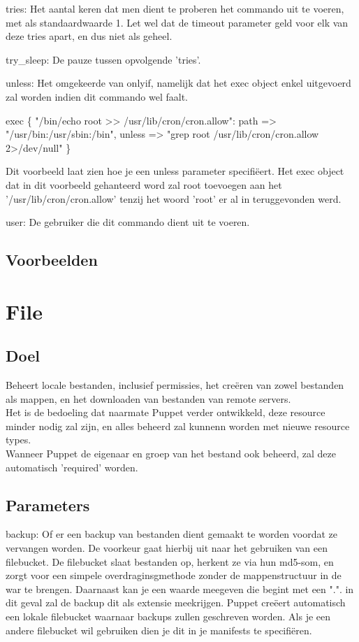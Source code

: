 		tries:
		Het aantal keren dat men dient te proberen het commando uit te voeren, met als standaardwaarde 1.
		Let wel dat de timeout parameter geld voor elk van deze tries apart, en dus niet als geheel.

		try\_sleep:
		De pauze tussen opvolgende 'tries'.

		unless:
		Het omgekeerde van onlyif, namelijk dat het exec object enkel uitgevoerd zal worden indien dit commando wel faalt.

			exec \{ "/bin/echo root >> /usr/lib/cron/cron.allow":
				path => "/usr/bin:/usr/sbin:/bin",
				unless => "grep root /usr/lib/cron/cron.allow 2>/dev/null"
			\}

		Dit voorbeeld laat zien hoe je een unless parameter specifi\"{e}ert.
		Het exec object dat in dit voorbeeld gehanteerd word zal root toevoegen aan het '/usr/lib/cron/cron.allow' tenzij het woord 'root' er al in teruggevonden werd.

		user:
		De gebruiker die dit commando dient uit te voeren.

\subsection{Voorbeelden}

\section{File}

\subsection{Doel}
	Beheert locale bestanden, inclusief permissies, het cre\"{e}ren van zowel bestanden als mappen, en het downloaden van bestanden van remote servers.\\
	Het is de bedoeling dat naarmate Puppet verder ontwikkeld, deze resource minder nodig zal zijn, en alles beheerd zal kunnenn worden met nieuwe resource types.\\

	Wanneer Puppet de eigenaar en groep van het bestand ook beheerd, zal deze automatisch 'required' worden.\\

\subsection{Parameters}
	backup:
	Of er een backup van bestanden dient gemaakt te worden voordat ze vervangen worden. De voorkeur gaat hierbij uit naar het gebruiken van een filebucket.	De filebucket slaat bestanden op, herkent ze via hun md5-som, en zorgt voor een simpele overdraginsgmethode zonder de mappenstructuur in de war te brengen. Daarnaast kan je een waarde meegeven die begint met een ".". in dit geval zal de backup dit als extensie meekrijgen. Puppet cre\"{e}ert automatisch een lokale filebucket waarnaar backups zullen geschreven worden. Als je een andere filebucket wil gebruiken dien je dit in je manifests te specifi\"{e}ren.\\

